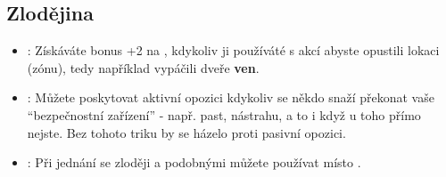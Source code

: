 \documentclass[../main.tex]{subfiles}
\begin{document}
\subsection{Zlodějina}
\label{sec:trik-zlodejina}

\begin{itemize}
\item{}:
  \label{sec:zlodejina-vratka}
  Získáváte bonus +2 na , kdykoliv ji používáté s akcí  abyste opustili lokaci (zónu), tedy například vypáčili dveře \textbf{ven}.

\item{}:
  \label{sec:zlodejina-odbornik}
  Můžete poskytovat aktivní opozici kdykoliv se někdo snaží překonat vaše ``bezpečnostní zařízení'' - např. past, nástrahu, a to i když u toho přímo nejste. Bez tohoto triku by se házelo proti pasivní opozici.

\item{}:
  \label{sec:zlodejina-septani}
  Při jednání se zloději a podobnými můžete používat  místo .
\end{itemize}
  
\end{document}
